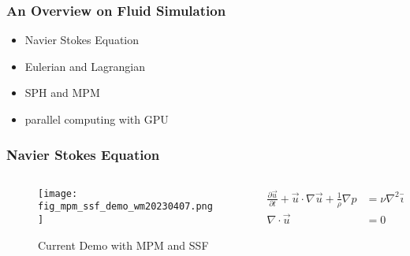 
\begin{frame}
    \frametitle{An Overview on Fluid Simulation}
    \begin{itemize}
        \item Navier Stokes Equation
        \item Eulerian and Lagrangian
        \item SPH and MPM
        \item parallel computing with GPU
    \end{itemize}
\end{frame}

\begin{frame}
    \frametitle{Navier Stokes Equation}

    \begin{columns}[c] %
        \begin{column}{0.45\textwidth} %
            \begin{figure}
                \texttt{[image: fig\_mpm\_ssf\_demo\_wm20230407.png]}
                \caption[short]{Current Demo with MPM and SSF}
            \end{figure}
        \end{column}
        \begin{column}{0.5\textwidth} %
            \begin{equation}
                \begin{aligned}
                    \frac{\partial \vec{u}}{\partial t} + \vec{u}\cdot \nabla \vec{u} + \frac{1}{\rho}\nabla p & = \nu \nabla^2 \vec{u} + \vec{g} \\
                    \nabla \cdot \vec{u}                                                                       & = 0
                \end{aligned}
            \end{equation}
        \end{column}
    \end{columns}

\end{frame}

